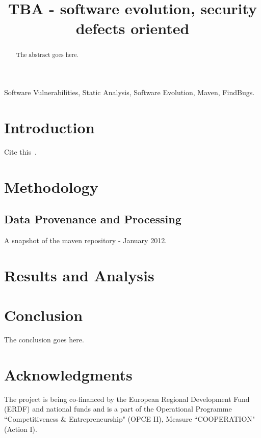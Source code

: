 \documentclass[conference]{IEEEtran}
\begin{document}
\title{TBA - software evolution, security defects oriented}


\author{
}
\maketitle

\begin{abstract}
The abstract goes here.
\end{abstract}

\begin{IEEEkeywords}
Software Vulnerabilities, Static Analysis, Software Evolution, Maven, FindBugs.
\end{IEEEkeywords}

\IEEEpeerreviewmaketitle

\section{Introduction}

Cite this~\cite{MNN11}.

\section{Methodology}
\label{sec:meth}

\subsection{Data Provenance and Processing}

A snapshot of the maven repository - January 2012.

\section{Results and Analysis}
\label{sec:res}

\section{Conclusion}
\label{sec:con}
The conclusion goes here.

\section*{Acknowledgments}

The project is being co-financed by the European Regional Development Fund (ERDF)
and national funds and is a part of the Operational Programme ``Competitiveness \&
Entrepreneurship" (OPCE II), Measure ``COOPERATION" (Action I).


 
\end{document}
